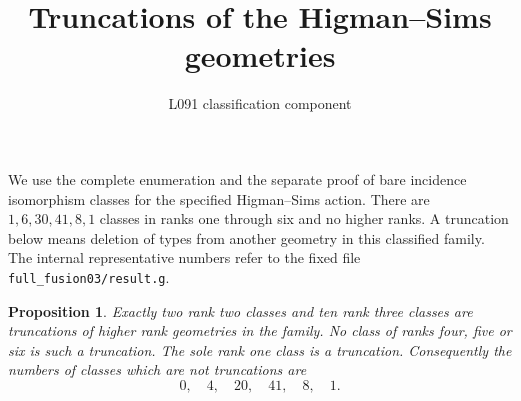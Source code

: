 \documentclass[11pt]{article}
\newtheorem{proposition}{Proposition}
\begin{document}
\title{Truncations of the Higman--Sims geometries}
\author{L091 classification component}\date{}\maketitle
We use the complete enumeration and the separate proof of bare incidence
isomorphism classes for the specified Higman--Sims action. There are
$1,6,30,41,8,1$ classes in ranks one through six and no higher ranks.
A truncation below means deletion of types from another geometry in this
classified family. The internal representative numbers refer to the
fixed file \texttt{full\_fusion03/result.g}.

\begin{proposition}
Exactly two rank two classes and ten rank three classes are truncations
of higher rank geometries in the family. No class of ranks four, five
or six is such a truncation. The sole rank one class is a truncation.
Consequently the numbers of classes which are not truncations are
\[
                     0,\quad4,\quad20,\quad41,\quad8,\quad1.
\]
\end{proposition}
\end{document}
